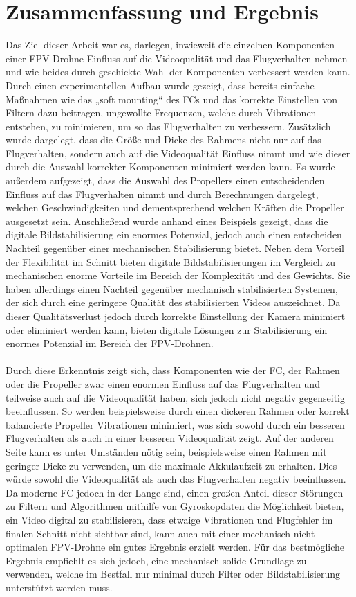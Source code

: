 
\section[Zusammenfassung und Ergebnis]{Zusammenfassung und Ergebnis}
Das Ziel dieser Arbeit war es, darlegen, inwieweit die einzelnen Komponenten einer FPV-Drohne Einfluss auf die Videoqualität und das Flugverhalten nehmen und wie beides durch geschickte Wahl der Komponenten verbessert werden kann. Durch einen experimentellen Aufbau wurde gezeigt, dass bereits einfache Maßnahmen wie das „soft mounting“ des FCs und das korrekte Einstellen von Filtern dazu beitragen, ungewollte Frequenzen, welche durch Vibrationen entstehen, zu minimieren, um so das Flugverhalten zu verbessern. Zusätzlich wurde dargelegt, dass die Größe und Dicke des Rahmens nicht nur auf das Flugverhalten, sondern auch auf die Videoqualität Einfluss nimmt und wie dieser durch die Auswahl korrekter Komponenten minimiert werden kann. Es wurde außerdem aufgezeigt, dass die Auswahl des Propellers einen entscheidenden Einfluss auf das Flugverhalten nimmt und durch Berechnungen dargelegt, welchen Geschwindigkeiten und dementsprechend welchen Kräften die Propeller ausgesetzt sein. Anschließend wurde anhand eines Beispiels gezeigt, dass die digitale Bildstabilisierung ein enormes Potenzial, jedoch auch einen entscheiden Nachteil gegenüber einer mechanischen Stabilisierung bietet. Neben dem Vorteil der Flexibilität im Schnitt bieten digitale Bildstabilisierungen im Vergleich zu mechanischen enorme Vorteile im Bereich der Komplexität und des Gewichts. Sie haben allerdings einen Nachteil gegenüber mechanisch stabilisierten Systemen, der sich durch eine geringere Qualität des stabilisierten Videos auszeichnet. Da dieser Qualitätsverlust jedoch durch korrekte Einstellung der Kamera minimiert oder eliminiert werden kann, bieten digitale Lösungen zur Stabilisierung ein enormes Potenzial im Bereich der FPV-Drohnen.
\\ \\
Durch diese Erkenntnis zeigt sich, dass Komponenten wie der FC, der Rahmen oder die Propeller zwar einen enormen Einfluss auf das Flugverhalten und teilweise auch auf die Videoqualität haben, sich jedoch nicht negativ gegenseitig beeinflussen. So werden beispielsweise durch einen dickeren Rahmen oder korrekt balancierte Propeller Vibrationen minimiert, was sich sowohl durch ein besseren Flugverhalten als auch in einer besseren Videoqualität zeigt. Auf der anderen Seite kann es unter Umständen nötig sein, beispielsweise einen Rahmen mit geringer Dicke zu verwenden, um die maximale Akkulaufzeit zu erhalten. Dies würde sowohl die Videoqualität als auch das Flugverhalten negativ beeinflussen. Da moderne FC jedoch in der Lange sind, einen großen Anteil dieser Störungen zu Filtern und Algorithmen mithilfe von Gyroskopdaten die Möglichkeit bieten, ein Video digital zu stabilisieren, dass etwaige Vibrationen und Flugfehler im finalen Schnitt nicht sichtbar sind, kann auch mit einer mechanisch nicht optimalen FPV-Drohne ein gutes Ergebnis erzielt werden. Für das bestmögliche Ergebnis empfiehlt es sich jedoch, eine mechanisch solide Grundlage zu verwenden, welche im Bestfall nur minimal durch Filter oder Bildstabilisierung unterstützt werden muss.
